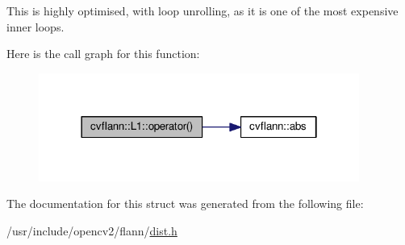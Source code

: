 This is highly optimised, with loop unrolling, as it is one of the most expensive inner loops. 

Here is the call graph for this function\-:\nopagebreak
\begin{figure}[H]
\begin{center}
\leavevmode
\includegraphics[width=298pt]{structcvflann_1_1L1_ad243d0a072c18dbbb63956cc429ffea2_cgraph}
\end{center}
\end{figure}




The documentation for this struct was generated from the following file\-:\begin{DoxyCompactItemize}
\item 
/usr/include/opencv2/flann/\hyperlink{dist_8h}{dist.\-h}\end{DoxyCompactItemize}
